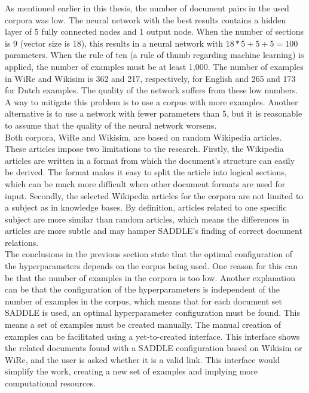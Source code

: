 As mentioned earlier in this thesis, the number of document pairs in the used corpora was low. The neural network with the best results contains a hidden layer of 5 fully connected nodes and 1 output node. When the number of sections is 9 (vector size is 18), this results in a neural network with $18 * 5 + 5 + 5  = 100$ parameters. When the rule of ten (a rule of thumb regarding machine learning) is applied, the number of examples must be at least 1,000. The number of examples in WiRe and Wikisim is 362 and 217, respectively, for English and 265 and 173 for Dutch examples. The quality of the network suffers from these low numbers.\\
A way to mitigate this problem is to use a corpus with more examples. Another alternative is to use a network with fewer parameters than 5, but it is reasonable to assume that the quality of the neural network worsens.\\

Both corpora, WiRe and Wikisim, are based on random Wikipedia articles. These articles impose two limitations to the research. Firstly, the Wikipedia articles are written in a format from which the document's structure can easily be derived. The format makes it easy to split the article into logical sections, which can be much more difficult when other document formats are used for input. Secondly, the selected Wikipedia articles for the corpora are not limited to a subject as in knowledge bases. By definition, articles related to one specific subject are more similar than random articles, which means the differences in articles are more subtle and may hamper SADDLE's finding of correct document relations.\\

The conclusions in the previous section state that the optimal configuration of the hyperparameters depends on the corpus being used. One reason for this can be that the number of examples in the corpora is too low. Another explanation can be that the configuration of the hyperparameters is independent of the number of examples in the corpus, which means that for each document set SADDLE is used, an optimal hyperparameter configuration must be found. This means a set of examples must be created manually. The manual creation of examples can be facilitated using a yet-to-created interface. This interface shows the related documents found with a SADDLE configuration based on Wikisim or WiRe, and the user is asked whether it is a valid link. This interface would simplify the work, creating a new set of examples and implying more computational resources.


